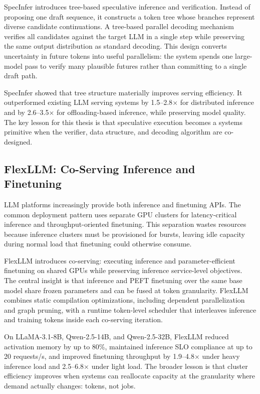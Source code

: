 \documentclass[11pt]{article}
\newcommand{\SpecInfer}{SpecInfer}
\newcommand{\FlexLLM}{FlexLLM}
\begin{document}
\SpecInfer{} introduces tree-based speculative inference and verification. Instead of proposing one draft sequence, it constructs a token tree whose branches represent diverse candidate continuations. A tree-based parallel decoding mechanism verifies all candidates against the target LLM in a single step while preserving the same output distribution as standard decoding. This design converts uncertainty in future tokens into useful parallelism: the system spends one large-model pass to verify many plausible futures rather than committing to a single draft path.

\SpecInfer{} showed that tree structure materially improves serving efficiency. It outperformed existing LLM serving systems by 1.5--2.8$\times$ for distributed inference and by 2.6--3.5$\times$ for offloading-based inference, while preserving model quality. The key lesson for this thesis is that speculative execution becomes a systems primitive when the verifier, data structure, and decoding algorithm are co-designed.

\subsection{\FlexLLM: Co-Serving Inference and Finetuning}

LLM platforms increasingly provide both inference and finetuning APIs. The common deployment pattern uses separate GPU clusters for latency-critical inference and throughput-oriented finetuning. This separation wastes resources because inference clusters must be provisioned for bursts, leaving idle capacity during normal load that finetuning could otherwise consume.

\FlexLLM{} introduces co-serving: executing inference and parameter-efficient finetuning on shared GPUs while preserving inference service-level objectives. The central insight is that inference and PEFT finetuning over the same base model share frozen parameters and can be fused at token granularity. \FlexLLM{} combines static compilation optimizations, including dependent parallelization and graph pruning, with a runtime token-level scheduler that interleaves inference and training tokens inside each co-serving iteration.

On LLaMA-3.1-8B, Qwen-2.5-14B, and Qwen-2.5-32B, \FlexLLM{} reduced activation memory by up to 80\%, maintained inference SLO compliance at up to 20 requests/s, and improved finetuning throughput by 1.9--4.8$\times$ under heavy inference load and 2.5--6.8$\times$ under light load. The broader lesson is that cluster efficiency improves when systems can reallocate capacity at the granularity where demand actually changes: tokens, not jobs.
\end{document}
